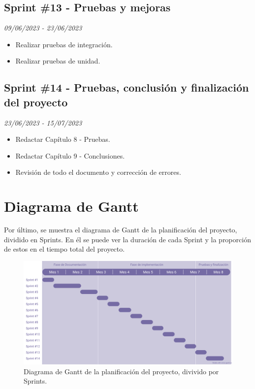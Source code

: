 \subsection{Sprint \#13 - Pruebas y mejoras}
\textit{09/06/2023   -   23/06/2023}
\begin{itemize}
    \item Realizar pruebas de integración.
    \item Realizar pruebas de unidad.
    \end{itemize}

\subsection{Sprint \#14 - Pruebas, conclusión y finalización del proyecto}
\textit{23/06/2023   -   15/07/2023}
\begin{itemize}

    \item Redactar Capítulo 8 - Pruebas.
    \item Redactar Capítulo 9 - Conclusiones.
    \item Revisión de todo el documento y corrección de errores.
\end{itemize}



\section{Diagrama de Gantt}
Por último, se muestra el diagrama de Gantt de la planificación del proyecto, dividido en Sprints. En él se puede ver la duración de cada Sprint y la proporción de estos en el tiempo total del proyecto.

\begin{figure}[H]

    \centering
    \centerline{\includegraphics[width=1.25\textwidth]{imagenes/c4/gantt.png}}
    \caption{Diagrama de Gantt de la planificación del proyecto, divivido por Sprints.}
    \label{fig:diagrama_gantt}
    
    
\end{figure}
